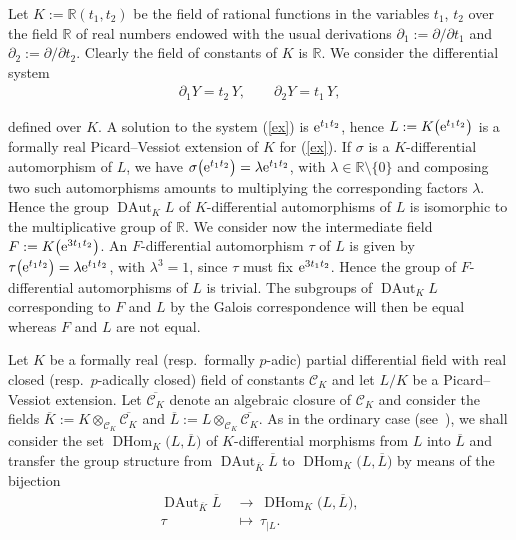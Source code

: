 \documentclass[pdftex]{sigma}%
\numberwithin{equation}{section}
\newcommand{\R}{\mathbb{R}}
\def \DAut{\operatorname{DAut}}
\def \DHom{\operatorname{DHom}}
\begin{document}
\begin{Example} Let $K:=\R(t_1,t_2)$ be the field of rational functions in the variables $t_1$, $t_2$ over the field $\R$ of real numbers endowed with the usual derivations $\partial_1:= \partial /\partial t_1$ and $\partial_2:= \partial /\partial t_2$. Clearly the field of constants of $K$ is $\R$. We consider the differential system
\begin{gather}\label{ex}
\partial_1 Y= t_2 \, Y, \qquad \partial_2 Y= t_1 \, Y,
\end{gather}

\noindent
defined over $K$. A solution to the system (\ref{ex}) is ${\rm e}^{t_1t_2}$, hence $L:=K\big({\rm e}^{t_1t_2}\big)$ is a formally real Picard--Vessiot extension of $K$ for (\ref{ex}). If $\sigma$ is a $K$-differential automorphism of $L$, we have $\sigma\big({\rm e}^{t_1t_2}\big)=\lambda {\rm e}^{t_1t_2}$, with $\lambda \in \R\setminus \{0\}$ and composing two such automorphisms amounts to multiplying the corresponding factors $\lambda$. Hence the group $\DAut_K L$ of $K$-differential automorphisms of $L$ is isomorphic to the multiplicative group of $\R$. We consider now the intermediate field $F:=K\big({\rm e}^{3t_1t_2}\big)$. An $F$-differential automorphism $\tau$ of $L$ is given by $\tau\big({\rm e}^{t_1t_2}\big)=\lambda {\rm e}^{t_1t_2}$, with $\lambda^3=1$, since $\tau$ must fix ${\rm e}^{3t_1t_2}$. Hence the group of $F$-differential automorphisms of $L$ is trivial. The subgroups of $\DAut_K L$ corresponding to $F$ and $L$ by the Galois correspondence will then be equal whereas $F$ and $L$ are not equal.
\end{Example}


Let $K$ be a formally real (resp.\ formally $p$-adic) partial differential field with real closed (resp.\ $p$-adically closed)
field of constants $\mathcal{C}_K$ and let $L/K$ be a Picard--Vessiot extension. Let $\overline{\mathcal{C}_K}$ denote an algebraic closure of $\mathcal{C}_K$ and consider the fields $\overline{K}:=K\otimes_{\mathcal{C}_K} \overline{\mathcal{C}_K}$ and $\overline{L}:=L\otimes_{\mathcal{C}_K} \overline{\mathcal{C}_K}$. As
in the ordinary case (see~\cite{CHSA}), we shall consider the set
$\DHom_K\big(L,\overline{L}\big)$ of $K$-differential morphisms from $L$ into
$\overline{L}$ and transfer the group structure from $\DAut_{\overline{K}} \overline{L}$ to
$\DHom_K\big(L,\overline{L}\big)$ by means of the bijection
\begin{align*}
\DAut_{\overline{K}} \overline{L} &\ \rightarrow \ \DHom_K\big(L,\overline{L}\big),
\\
\tau &\ \mapsto \ \tau_{|L}.
\end{align*}
\end{document}
